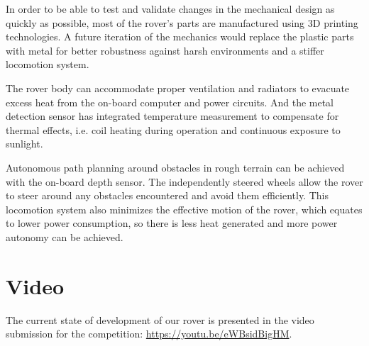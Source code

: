 In order to be able to test and validate changes in the mechanical design as quickly as possible, most of the rover's parts are manufactured using 3D printing technologies.
A future iteration of the mechanics would replace the plastic parts with metal for better robustness against harsh environments and a stiffer locomotion system.

The rover body can accommodate proper ventilation and radiators to evacuate excess heat from the on-board computer and power circuits.
And the metal detection sensor has integrated temperature measurement to compensate for thermal effects, i.e. coil heating during operation and continuous exposure to sunlight.

Autonomous path planning around obstacles in rough terrain can be achieved with the on-board depth sensor.
The independently steered wheels allow the rover to steer around any obstacles encountered and avoid them efficiently.
This locomotion system also minimizes the effective motion of the rover, which equates to lower power consumption, so there is less heat generated and more power autonomy can be achieved.

\section{Video}
The current state of development of our rover is presented in the video submission for the competition: \url{https://youtu.be/eWBsidBigHM}.
